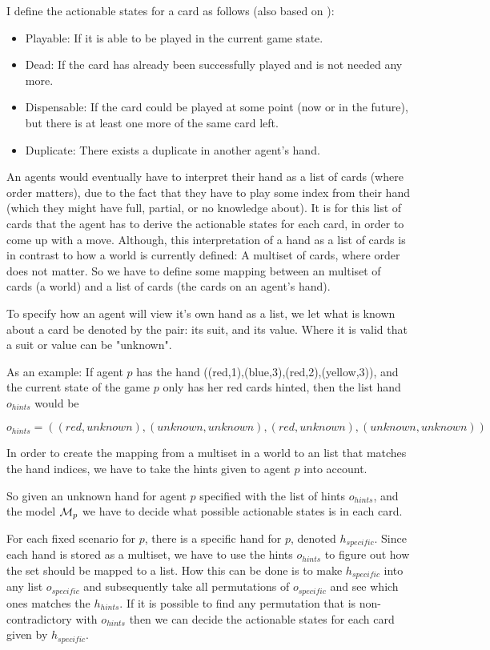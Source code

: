 I define the actionable states for a card as follows (also based on \cite{CoxEtAl2015}):
\begin{itemize}
	\item Playable: If it is able to be played in the current game state.
	\item Dead: If the card has already been successfully played and is not needed any more.
	\item Dispensable: If the card could be played at some point (now or in the future), but there is at least one more of the same card left.
	\item Duplicate: There exists a duplicate in another agent's hand.
\end{itemize}
An agents would eventually have to interpret their hand as a list of cards (where order matters),
due to the fact that they have to play some index from their hand (which they might have full, partial, or no knowledge about).
It is for this list of cards that the agent has to derive the actionable states for each card, in order to come up with a move.
Although, this interpretation of a hand as a list of cards is in contrast to how a world is currently defined: A multiset of cards, where order does not matter.
So we have to define some mapping between an multiset of cards (a world) and a list of cards (the cards on an agent's hand).

To specify how an agent will view it's own hand as a list, we let what is known about a card be denoted by the pair: its suit, and its value. Where it is valid that a suit or value can be "unknown".

As an example: If agent $p$ has the hand ((red,1),(blue,3),(red,2),(yellow,3)), and the current state of the game $p$ only has her red cards hinted, then the list hand $o_{hints}$ would be

\[o_{hints} = ((red,unknown),(unknown,unknown),(red,unknown),(unknown,unknown))\]

In order to create the mapping from a multiset in a world to an list that matches the hand indices, we have to take the hints given to agent $p$ into account.

So given an unknown hand for agent $p$ specified with the list of hints $o_{hints}$, and the model $\mathcal{M}_p$ we have to decide what possible actionable states is in each card. 

For each fixed scenario for $p$, there is a specific hand for $p$, denoted $h_{specific}$.
Since each hand is stored as a multiset, we have to use the hints $o_{hints}$ to figure out how the set should be mapped to a list.
How this can be done is to make $h_{specific}$ into any list $o_{specific}$ and subsequently take all permutations of $o_{specific}$ and see which ones matches the $h_{hints}$.
If it is possible to find any permutation that is non-contradictory with $o_{hints}$ then we can decide the actionable states for each card given by $h_{specific}$.


